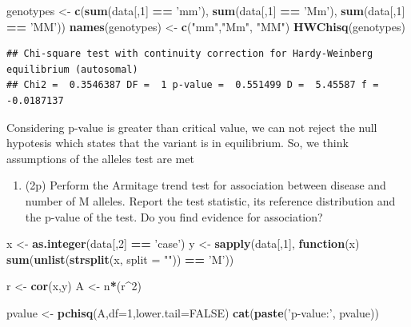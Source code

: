 \documentclass[
]{article}
\newenvironment{Shaded}{\begin{snugshade}}{\end{snugshade}}
\newcommand{\ControlFlowTok}[1]{\textcolor[rgb]{0.13,0.29,0.53}{\textbf{#1}}}
\newcommand{\DataTypeTok}[1]{\textcolor[rgb]{0.13,0.29,0.53}{#1}}
\newcommand{\DecValTok}[1]{\textcolor[rgb]{0.00,0.00,0.81}{#1}}
\newcommand{\KeywordTok}[1]{\textcolor[rgb]{0.13,0.29,0.53}{\textbf{#1}}}
\newcommand{\NormalTok}[1]{#1}
\newcommand{\OperatorTok}[1]{\textcolor[rgb]{0.81,0.36,0.00}{\textbf{#1}}}
\newcommand{\OtherTok}[1]{\textcolor[rgb]{0.56,0.35,0.01}{#1}}
\newcommand{\StringTok}[1]{\textcolor[rgb]{0.31,0.60,0.02}{#1}}
\providecommand{\tightlist}{%
  \setlength{\itemsep}{0pt}\setlength{\parskip}{0pt}}
\begin{document}
\begin{Shaded}
\begin{Highlighting}[]
\NormalTok{genotypes <-}\StringTok{ }\KeywordTok{c}\NormalTok{(}\KeywordTok{sum}\NormalTok{(data[,}\DecValTok{1}\NormalTok{] }\OperatorTok{==}\StringTok{ 'mm'}\NormalTok{), }\KeywordTok{sum}\NormalTok{(data[,}\DecValTok{1}\NormalTok{] }\OperatorTok{==}\StringTok{ 'Mm'}\NormalTok{), }\KeywordTok{sum}\NormalTok{(data[,}\DecValTok{1}\NormalTok{] }\OperatorTok{==}\StringTok{ 'MM'}\NormalTok{))}
\KeywordTok{names}\NormalTok{(genotypes) <-}\StringTok{ }\KeywordTok{c}\NormalTok{(}\StringTok{"mm"}\NormalTok{,}\StringTok{"Mm"}\NormalTok{, }\StringTok{"MM"}\NormalTok{)}
\KeywordTok{HWChisq}\NormalTok{(genotypes)}
\end{Highlighting}
\end{Shaded}

\begin{verbatim}
## Chi-square test with continuity correction for Hardy-Weinberg equilibrium (autosomal)
## Chi2 =  0.3546387 DF =  1 p-value =  0.551499 D =  5.45587 f =  -0.0187137
\end{verbatim}

Considering p-value is greater than critical value, we can not reject
the null hypotesis which states that the variant is in equilibrium. So,
we think assumptions of the alleles test are met

\begin{enumerate}
\def\labelenumi{\arabic{enumi}.}
\setcounter{enumi}{4}
\tightlist
\item
  (2p) Perform the Armitage trend test for association between disease
  and number of M alleles. Report the test statistic, its reference
  distribution and the p-value of the test. Do you find evidence for
  association?
\end{enumerate}

\begin{Shaded}
\begin{Highlighting}[]
\NormalTok{x <-}\StringTok{ }\KeywordTok{as.integer}\NormalTok{(data[,}\DecValTok{2}\NormalTok{] }\OperatorTok{==}\StringTok{ 'case'}\NormalTok{)}
\NormalTok{y <-}\StringTok{ }\KeywordTok{sapply}\NormalTok{(data[,}\DecValTok{1}\NormalTok{], }\ControlFlowTok{function}\NormalTok{(x) }\KeywordTok{sum}\NormalTok{(}\KeywordTok{unlist}\NormalTok{(}\KeywordTok{strsplit}\NormalTok{(x, }\DataTypeTok{split =} \StringTok{""}\NormalTok{)) }\OperatorTok{==}\StringTok{ 'M'}\NormalTok{))}

\NormalTok{r <-}\StringTok{ }\KeywordTok{cor}\NormalTok{(x,y)}
\NormalTok{A <-}\StringTok{ }\NormalTok{n}\OperatorTok{*}\NormalTok{(r}\OperatorTok{^}\DecValTok{2}\NormalTok{)}

\NormalTok{pvalue <-}\StringTok{ }\KeywordTok{pchisq}\NormalTok{(A,}\DataTypeTok{df=}\DecValTok{1}\NormalTok{,}\DataTypeTok{lower.tail=}\OtherTok{FALSE}\NormalTok{)}
\KeywordTok{cat}\NormalTok{(}\KeywordTok{paste}\NormalTok{(}\StringTok{'p-value:'}\NormalTok{, pvalue))}
\end{Highlighting}
\end{Shaded}
\end{document}
